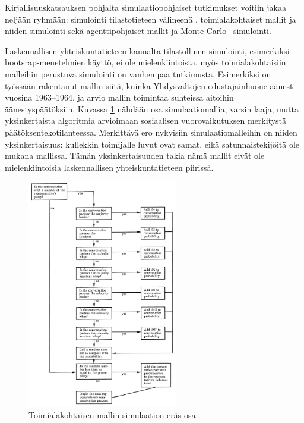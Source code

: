 \documentclass[finnish,gradu,twoside,12pt]{tktltiki}
\begin{document}

Kirjallisuuskatsauksen pohjalta simulaatiopohjaiset tutkimukset voitiin jakaa neljään ryhmään: simulointi tilastotieteen välineenä \citep[esimerkiksi][]{clinton2004statistical,imai2012statistical,mooney1996bootstrap}, toimialakohtaiset mallit ja niiden simulointi \citep[esimerkiksi][]{Shapiro1968} sekä agenttipohjaiset mallit \citep[esimerkiksi][]{orbell2004machiavellian,altaweel2012mobilizing,anderson2011highlights,bloomquist2006comparison} ja Monte Carlo --simulointi.

Laskennallisen yhteiskuntatieteen kannalta tilastollinen simulointi, esimerkiksi bootsrap-menetelmien käyttö, ei ole mielenkiintoista, myös toimialakohtaisiin malleihin perustuva simulointi on vanhempaa tutkimusta. Esimerkiksi \citet{Shapiro1968} on työssään rakentanut mallin siitä, kuinka Yhdysvaltojen edustajainhuone äänesti vuosina 1963--1964, ja arvio mallin toimintaa suhteissa aitoihin äänestyspäätöksiin. Kuvassa \ref{fig:domain_sim} nähdään osa simulaatiomallia, varsin laaja, mutta yksinkertaista algoritmia arvioimaan sosiaalisen vuorovaikutuksen merkitystä päätöksentekotilanteessa. Merkittävä ero nykyisiin simulaatiomalleihin on niiden yksinkertaisuus: kullekkin toimijalle luvut ovat samat, eikä satunnaistekijöitä ole mukana mallissa. Tämän yksinkertaisuuden takia nämä mallit eivät ole mielenkiintoisia laskennallisen yhteiskuntatieteen piirissä.

\begin{figure}
\includegraphics[height=10cm]{images/domain_spesific_model.png} 
\caption{Toimialakohtaisen mallin simulaation eräs osa \citep{Shapiro1968}}
\label{fig:domain_sim}
\end{figure}
\end{document}
